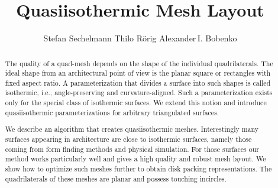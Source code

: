 \documentclass[twoside]{article}
\begin{document}
\title{Quasiisothermic Mesh Layout}

\author{Stefan Sechelmann
\makebox[0.5cm]{} 
Thilo R\"orig
\makebox[0.5cm]{}
Alexander\,I. Bobenko
}

\maketitle

\def\shortauthor{S.\ Sechelmann, T.\ R\"orig, and A.\ I.\ Bobenko} 
\def\shorttitle{Quasiisothermic Mesh Layout}

\begin{abstract}
The quality of a quad-mesh depends on the shape of the individual
quadrilaterals. The ideal shape from an architectural point of view is the
planar square or rectangles with fixed aspect ratio. A parameterization that divides a
surface into such shapes is called isothermic, i.e., angle-preserving and
curvature-aligned. Such a parameterization exists only for the special class of
isothermic surfaces. We extend this notion and introduce quasiisothermic
parameterizations for arbitrary triangulated  surfaces.

We describe an algorithm that creates quasiisothermic meshes.
Interestingly many surfaces appearing in architecture are close to
isothermic surfaces, namely those coming from form finding methods and physical
simulation. For those surfaces our method works particularly well and gives a
high quality and robust mesh layout. We show how to optimize such meshes
further to obtain disk packing representations. The quadrilaterals of these
meshes are planar and possess touching incircles.
\end{abstract}
\end{document}
